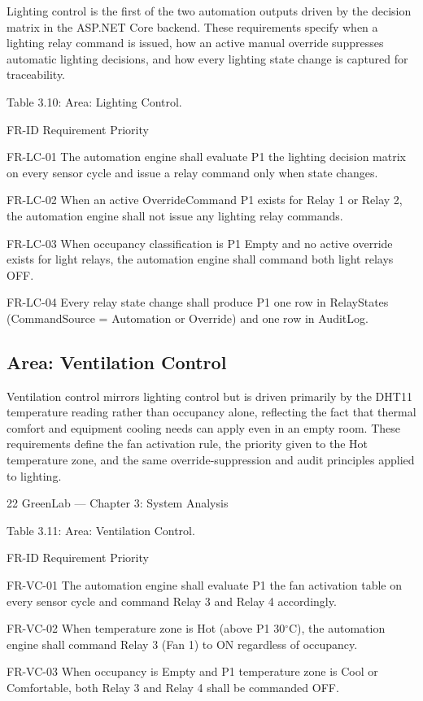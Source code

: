 Lighting control is the first of the two automation outputs driven by the decision matrix in the
ASP.NET Core backend. These requirements specify when a lighting relay command is issued,
how an active manual override suppresses automatic lighting decisions, and how every lighting
state change is captured for traceability.

Table 3.10: Area: Lighting Control.

FR-ID Requirement Priority

FR-LC-01 The automation engine shall evaluate P1
the lighting decision matrix on every
sensor cycle and issue a relay
command only when state changes.

FR-LC-02 When an active OverrideCommand P1
exists for Relay 1 or Relay 2, the
automation engine shall not issue any
lighting relay commands.

FR-LC-03 When occupancy classification is P1
Empty and no active override exists
for light relays, the automation engine
shall command both light relays OFF.

FR-LC-04 Every relay state change shall produce P1
one row in RelayStates
(CommandSource = Automation or
Override) and one row in AuditLog.


\subsection{Area: Ventilation Control}

Ventilation control mirrors lighting control but is driven primarily by the DHT11 temperature
reading rather than occupancy alone, reflecting the fact that thermal comfort and equipment
cooling needs can apply even in an empty room. These requirements define the fan activation rule,
the priority given to the Hot temperature zone, and the same override-suppression and audit
principles applied to lighting.




22
GreenLab --- Chapter 3: System Analysis


Table 3.11: Area: Ventilation Control.

FR-ID Requirement Priority

FR-VC-01 The automation engine shall evaluate P1
the fan activation table on every sensor
cycle and command Relay 3 and Relay
4 accordingly.

FR-VC-02 When temperature zone is Hot (above P1
30$^\circ$C), the automation engine shall
command Relay 3 (Fan 1) to ON
regardless of occupancy.

FR-VC-03 When occupancy is Empty and P1
temperature zone is Cool or
Comfortable, both Relay 3 and Relay 4
shall be commanded OFF.


